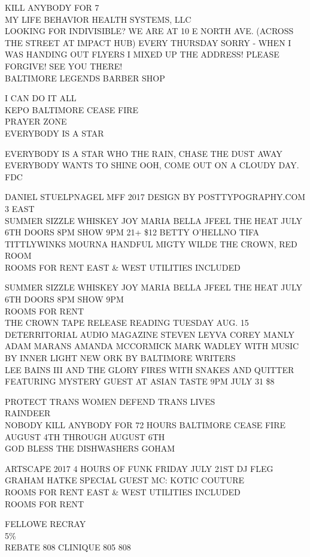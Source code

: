 \documentclass[10pt,letterpaper]{article}
\begin{document}
KILL ANYBODY FOR 7\\
MY LIFE BEHAVIOR HEALTH SYSTEMS, LLC\\
LOOKING FOR INDIVISIBLE?  WE ARE AT 10 E NORTH AVE. (ACROSS THE STREET AT IMPACT HUB) EVERY THURSDAY SORRY  {-} WHEN I WAS HANDING OUT FLYERS I MIXED UP THE ADDRESS!  PLEASE FORGIVE!  SEE YOU THERE!\\
BALTIMORE LEGENDS BARBER SHOP

I CAN DO IT ALL\\
KEPO BALTIMORE CEASE FIRE\\
PRAYER ZONE\\
EVERYBODY IS A STAR

EVERYBODY IS A STAR WHO THE RAIN, CHASE THE DUST AWAY EVERYBODY WANTS TO SHINE OOH, COME OUT ON A CLOUDY DAY.\\
FDC

DANIEL STUELPNAGEL MFF 2017 DESIGN BY POSTTYPOGRAPHY.COM\\
3 EAST\\
SUMMER SIZZLE WHISKEY JOY MARIA BELLA JFEEL THE HEAT JULY 6TH DOORS 8PM SHOW 9PM 21+ \$12 BETTY O'HELLNO TIFA TITTLYWINKS MOURNA HANDFUL MIGTY WILDE THE CROWN, RED ROOM\\
ROOMS FOR RENT EAST \& WEST UTILITIES INCLUDED

SUMMER SIZZLE WHISKEY JOY MARIA BELLA JFEEL THE HEAT JULY 6TH DOORS 8PM SHOW 9PM\\
ROOMS FOR RENT\\
THE CROWN TAPE RELEASE READING TUESDAY AUG. 15 DETERRITORIAL AUDIO MAGAZINE STEVEN LEYVA COREY MANLY ADAM MARANS AMANDA MCCORMICK MARK WADLEY WITH MUSIC BY INNER LIGHT NEW ORK BY BALTIMORE WRITERS\\
LEE BAINS III AND THE GLORY FIRES WITH SNAKES AND QUITTER FEATURING MYSTERY GUEST AT ASIAN TASTE 9PM JULY 31 \$8

PROTECT TRANS WOMEN DEFEND TRANS LIVES\\
RAINDEER\\
NOBODY KILL ANYBODY FOR 72 HOURS BALTIMORE CEASE FIRE AUGUST 4TH THROUGH AUGUST 6TH\\
GOD BLESS THE DISHWASHERS GOHAM

ARTSCAPE 2017 4 HOURS OF FUNK FRIDAY JULY 21ST DJ FLEG GRAHAM HATKE SPECIAL GUEST MC: KOTIC COUTURE\\
ROOMS FOR RENT EAST \& WEST UTILITIES INCLUDED\\
ROOMS FOR RENT

FELLOWE RECRAY\\
5\%\\
REBATE 808 CLINIQUE 805 808
\end{document}
